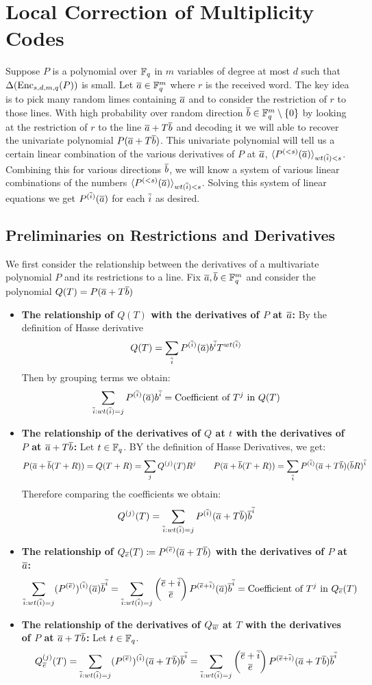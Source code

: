 \section{Local Correction of Multiplicity Codes}
Suppose $P$ is a polynomial over $\mathbb{F}_q$ in $m$ variables of degree at most $d$ such that $\Delta(\operatorname{Enc}_{s,d,m,q}(P))$ is small. Let $\overline{a}\in \mathbb{F}_q^m$ where $r$ is the received word. The key idea is to pick many random limes containing $\overline{a}$ and to consider the restriction of $r$ to those lines. With high probability over  random direction $\overline{b}\in \mathbb{F}_q^m\setminus\{0\}$ by looking at the restriction of $r$ to the line $\overline{a}+T\overline{b}$ and decoding it we will able to recover the univariate polynomial $P(\overline{a}+T\overline{b})$. This univariate polynomial will tell us a certain linear combination of the various derivatives of $P$ at $\overline{a}$, $\langle P^{(<s)}(\overline{a})\rangle_{wt(\overline{i})<s}$. Combining this for various directions $\overline{b}$, we will know a system of various linear combinations of the numbers $\langle P^{(<s)}(\overline{a})\rangle_{wt(\overline{i})<s}$. Solving this system of linear equations we get $P^{(\overline{i})}(\overline{a})$ for each $\overline{i}$ as desired.
\subsection{Preliminaries on Restrictions and Derivatives}
We first consider the relationship between the derivatives of a multivariate polynomial $P$ and its restrictions to a line. Fix $\overline{a},\overline{b}\in \mathbb{F}_q^m$ and consider the polynomial $Q(T)=P(\overline{a}+T\overline{b})$
\begin{itemize}
	\item \textbf{The relationship of $Q(T)$ with the derivatives of $P$ at $\overline{a}$:} By the definition of Hasse derivative $$Q(T)=\sum_{\overline{i}}P^{(\overline{i})}(\overline{a})b^{\overline{i}}T^{wt(\overline{i})}$$Then by grouping terms we obtain: $$\sum_{\overline{i}:wt(\overline{i})=j}P^{(\overline{i})}(\overline{a})b^{\overline{i}}=\text{Coefficient of $T^j$ in $Q(T)$}$$
	\item \textbf{The relationship of the derivatives of $Q$ at $t$ with the derivatives of $P$ at $\overline{a}+T\overline{b}$:} Let $t\in \mathbb{F}_q$. BY the definition of Hasse Derivatives, we get: $$P(\overline{a}+\overline{b}(T+R))=Q(T+R)=\sum_{j}Q^{(j)}(T)R^j\qquad P(\overline{a}+\overline{b}(T+R))=\sum_{\overline{i}}P^{(\overline{i})}(\overline{a}+T\overline{b})(\overline{b} R)^{\overline{i}}$$Therefore comparing the coefficients we obtain: $$Q^{(j)}(T)=\sum_{\overline{i}:wt(\overline{i})=j}P^{(\overline{i})}(\overline{a}+T\overline{b})\overline{b}^{\overline{i}}$$
	\item \textbf{The relationship of $Q_{\overline{e}}(T)\coloneqq P^{(\overline{e})}(\overline{a}+T\overline{b})$ with the derivatives of $P$ at $\overline{a}$:} $$\sum_{\overline{i}:wt(\overline{i})=j} (P^{(\overline{e})})^{(\overline{i})}(\overline{a})\overline{b}^{\overline{i}}=\sum_{\overline{i}:wt(\overline{i})=j}\left(\begin{matrix} \overline{e}+\overline{i}\\ \overline{e} \end{matrix}\right)P^{(\overline{e}+\overline{i})}(\overline{a})\overline{b}^{\overline{i}}=\text{Coefficient of $T^j$ in $Q_{\overline{e}}(T)$}$$
	\item \textbf{The relationship of the derivatives of $Q_{\overline{w}}$ at $T$ with the derivatives of $P$ at $\overline{a}+T\overline{b}$:} Let $t\in \mathbb{F}_q$.$$Q_{\overline{e}}^{(j)}(T)=\sum_{\overline{i}:wt(\overline{i})=j}(P^{(\overline{e})})^{(\overline{i})}(\overline{a}+T\overline{b})\overline{b}^{\overline{i}}=\sum_{\overline{i}:wt(\overline{i})=j}\left(\begin{matrix} \overline{e}+\overline{i}\\ \overline{e} \end{matrix}\right)P^{(\overline{e}+\overline{i})}(\overline{a}+T\overline{b})\overline{b}^{\overline{i}}$$
\end{itemize}

